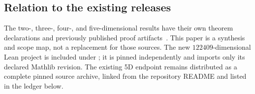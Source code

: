 \subsection{Relation to the existing releases}
The two-, three-, four-, and five-dimensional results have their own theorem declarations and previously published proof artifacts~\cite{dimensionbridge,threeDimensional,fiveDimensional}. This paper is a synthesis and scope map, not a replacement for those sources. The new $122409$-dimensional Lean project is included under ; it is pinned independently and imports only its declared Mathlib revision. The existing 5D endpoint remains distributed as a complete pinned source archive, linked from the repository README and listed in the ledger below.

